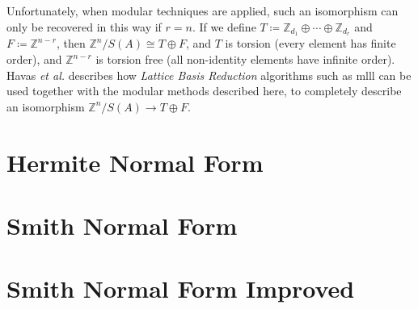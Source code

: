 \documentclass[12pt,a4paper,answers]{exam}
\newcommand{\Z}{\mathbb{Z}}
\theoremstyle{definition}
\begin{document}
Unfortunately, when modular techniques are applied, such an isomorphism can only be recovered in this way if $r=n$. If we define $T\coloneqq\Z_{d_1}\oplus\cdots\oplus\Z_{d_r}$ and $F\coloneqq\Z^{n-r}$, then $\Z^n/S(A)\cong T\oplus F$, and $T$ is torsion (every element has finite order), and $\Z^{n-r}$ is torsion free (all non-identity elements have infinite order). Havas \emph{et al.} \cite{havas} describes how \emph{Lattice Basis Reduction} algorithms such as {\sc mlll} can be used together with the modular methods described here, to completely describe an isomorphism $\Z^n/S(A)\to T\oplus F$.

\printbibliography
\clearpage
\appendix

\section{Hermite Normal Form}

\label{hnfcode}



\section{Smith Normal Form}

\label{snfcode}



\section{Smith Normal Form Improved}

\label{snfimprovedcode}


\end{document}
